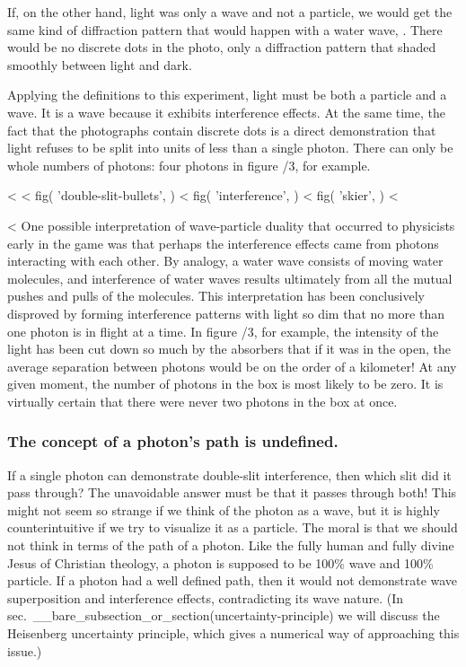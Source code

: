 If, on the other hand, light was only a wave and not a
particle, we would get the same kind of diffraction pattern
that would happen with a water wave, . There would be no
discrete dots in the photo, only a  diffraction pattern that
shaded smoothly between light and dark.

Applying the definitions to this experiment, light must be
both a particle and a wave. It is a wave because it exhibits
interference effects. At the same time, the fact that the
photographs contain discrete dots is a direct demonstration
that light refuses to be split into units of less than a
single photon. There can only be whole numbers of photons:
four photons in figure /3, for example.

<%
<%
  fig(
    'double-slit-bullets',
  )
\spacebetweenfigs
<%
  fig(
    'interference',
  )
\spacebetweenfigs
<%
  fig(
    'skier',
  )
<%

<%
One possible interpretation of wave-particle duality that
occurred to physicists early in the game was that perhaps
the interference effects came from photons interacting with
each other. By analogy, a water wave consists of moving
water molecules, and interference of water waves results
ultimately from all the mutual pushes and pulls of the
molecules. This interpretation has been conclusively disproved by
forming interference patterns with light so dim that no more than one photon
is in flight at a time. In figure /3, for example, the
intensity of the light has been cut down so much by the
absorbers that if it was in the open, the average separation
between photons would be on the order of a kilometer! At any
given moment, the number of photons in the box is most
likely to be zero. It is virtually certain that there were
never two photons in the box at once.

\subsubsection{The concept of a photon's
 path is undefined.}
If a single photon can demonstrate double-slit interference,
then which slit did it pass through? The unavoidable answer
must be that it passes through both! This might not seem so
strange if we think of the photon as a wave, but it is
highly counterintuitive if we try to visualize it as a
particle. The moral is that we should not think in terms of
the path of a photon. Like the fully human and fully divine
Jesus of Christian theology, a photon is supposed to be
100\% wave and 100\% particle. If a photon had a well
defined path, then it would not demonstrate wave superposition
and interference effects, contradicting its wave nature. (In
sec.~__bare_subsection_or_section(uncertainty-principle)
we will discuss the Heisenberg uncertainty
principle, which gives a numerical way of approaching this issue.)

